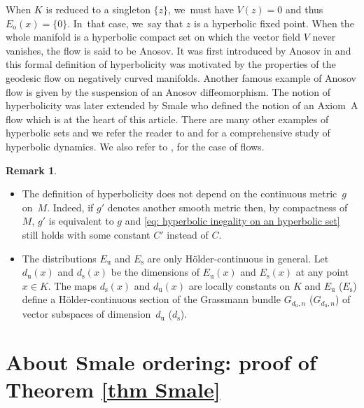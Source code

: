 \documentclass[JEP,XML,SOM,Unicode,NoEqCountersInSection,NoFloatCountersInSection,published]{cedram}
\newcommand{\ro}{\mathrm{o}}
\newcommand{\rs}{\mathrm{s}}
\newcommand{\ru}{\mathrm{u}}
\theoremstyle{definition}
\newtheorem{remark}[definition]{Remark}
\theoremstyle{plain}
\begin{document}
\begin{appendix}
When $K$ is reduced to a singleton $\{z\}$, we~must have $V(z) \!=\! 0$ and thus \hbox{$E_\ro (x) \!=\! \{0\}$}. In~that case, we~say that $z$ is a hyperbolic fixed point. When the whole manifold is a hyperbolic compact set on which the vector field $V$ never vanishes, the flow is said to be Anosov. It was first introduced by Anosov in \cite{anosov} and this formal definition of hyperbolicity was motivated by the properties of the geodesic flow on negatively curved manifolds. Another famous example of Anosov flow is given by the suspension of an Anosov diffeomorphism. The notion of hyperbolicity was later extended by Smale who defined the notion of an Axiom~A flow which is at the heart of this article. There are many other examples of hyperbolic sets and we refer the reader to \cite{katok-hasselblatt} and \cite{palis-demelo} for a comprehensive study of hyperbolic dynamics. We also refer to \cite{dyatlov}, \cite{FH} for the case of flows.

\skpt
\begin{remark}
\begin{itemize}
\item The definition of hyperbolicity does not depend on the continuous metric~$g$ on~$M$. Indeed, if $g'$ denotes another smooth metric then, by compactness of $M$, $g'$ is equivalent to $g$ and \eqref{eq: hyperbolic inegality on an hyperbolic set} still holds with some constant $C'$ instead of $C$.
\item The distributions $E_\ru$ and $E_\rs$ are only Hölder-continuous in general. Let $d_\ru (x)$ and $d_\rs (x)$ be the dimensions of $E_\ru (x)$ and $E_\rs (x)$ at any point $x \in K$. The maps $d_\rs (x)$ and $d_\ru (x)$ are locally constants on $K$ and $E_\ru$ (\resp $E_\rs$) define a Hölder-continuous section of the Grassmann bundle $G_{d_\ru, n}$ (\resp $G_{d_\ru, n}$) of vector subspaces of dimension~$d_\ru$ (\resp $d_\rs$).
\end{itemize}
\end{remark}

\section{About Smale ordering: proof of Theorem \ref{thm Smale}}


\end{appendix}
\end{document}
